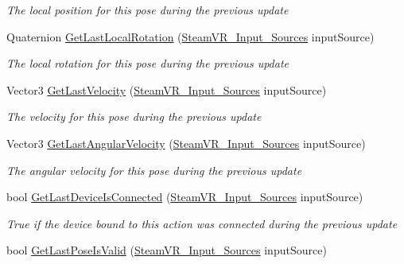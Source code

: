\begin{DoxyCompactItemize}
\begin{DoxyCompactList}\small\item\em The local position for this pose during the previous update \end{DoxyCompactList}\item 
Quaternion \mbox{\hyperlink{class_valve_1_1_v_r_1_1_steam_v_r___action___pose___base_a39183e3163c2c45a353137b92c9475ce}{Get\+Last\+Local\+Rotation}} (\mbox{\hyperlink{namespace_valve_1_1_v_r_a82e5bf501cc3aa155444ee3f0662853f}{Steam\+V\+R\+\_\+\+Input\+\_\+\+Sources}} input\+Source)
\begin{DoxyCompactList}\small\item\em The local rotation for this pose during the previous update \end{DoxyCompactList}\item 
Vector3 \mbox{\hyperlink{class_valve_1_1_v_r_1_1_steam_v_r___action___pose___base_a21d4d04f961d37630361750444666774}{Get\+Last\+Velocity}} (\mbox{\hyperlink{namespace_valve_1_1_v_r_a82e5bf501cc3aa155444ee3f0662853f}{Steam\+V\+R\+\_\+\+Input\+\_\+\+Sources}} input\+Source)
\begin{DoxyCompactList}\small\item\em The velocity for this pose during the previous update \end{DoxyCompactList}\item 
Vector3 \mbox{\hyperlink{class_valve_1_1_v_r_1_1_steam_v_r___action___pose___base_a1c0012123202777151db1e7364ca7abe}{Get\+Last\+Angular\+Velocity}} (\mbox{\hyperlink{namespace_valve_1_1_v_r_a82e5bf501cc3aa155444ee3f0662853f}{Steam\+V\+R\+\_\+\+Input\+\_\+\+Sources}} input\+Source)
\begin{DoxyCompactList}\small\item\em The angular velocity for this pose during the previous update \end{DoxyCompactList}\item 
bool \mbox{\hyperlink{class_valve_1_1_v_r_1_1_steam_v_r___action___pose___base_a55d19b1a7931ed13d689a7c3acb31581}{Get\+Last\+Device\+Is\+Connected}} (\mbox{\hyperlink{namespace_valve_1_1_v_r_a82e5bf501cc3aa155444ee3f0662853f}{Steam\+V\+R\+\_\+\+Input\+\_\+\+Sources}} input\+Source)
\begin{DoxyCompactList}\small\item\em True if the device bound to this action was connected during the previous update \end{DoxyCompactList}\item 
bool \mbox{\hyperlink{class_valve_1_1_v_r_1_1_steam_v_r___action___pose___base_a0071aa67fdb7a1f25f261f58236f182d}{Get\+Last\+Pose\+Is\+Valid}} (\mbox{\hyperlink{namespace_valve_1_1_v_r_a82e5bf501cc3aa155444ee3f0662853f}{Steam\+V\+R\+\_\+\+Input\+\_\+\+Sources}} input\+Source)

\end{DoxyCompactItemize}
